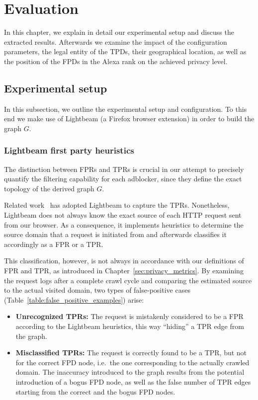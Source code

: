 
\chapter{Evaluation}
\label{sec:evaluation}
In this chapter, we explain in detail our experimental setup and discuss the extracted results. Afterwards we examine the impact of the configuration parameters, the legal entity of the TPDs, their geographical location, as well as the position of the FPDs in the Alexa rank on the achieved privacy level.

\section{Experimental setup}
In this subsection, we outline the experimental setup and configuration. To this end we make use of Lightbeam (a Firefox browser extension) in order to build the graph $G$.

\subsection{Lightbeam first party heuristics}
The distinction between FPRs and TPRs is crucial in our attempt to precisely quantify the filtering capability for each adblocker, since they define the exact topology of the derived graph $G$.

Related work~\cite{ruffel2015} has adopted Lightbeam to capture the TPRs. Nonetheless, Lightbeam does not always know the exact source of each HTTP request sent from our browser. As a consequence, it implements heuristics to determine the source domain that a request is initiated from and afterwards classifies it accordingly as a FPR or a TPR.

This classification, however, is not always in accordance with our definitions of FPR and TPR, as introduced in Chapter~\ref{sec:privacy_metrics}. By examining the request logs after a complete crawl cycle and comparing the estimated source to the actual visited domain, two types of false-positive cases (Table~\ref{table:false_positive_examples}) arise:

\begin{itemize}
\item \textbf{Unrecognized TPRs:} The request is mistakenly considered to be a FPR according to the Lightbeam heuristics, this way ``hiding'' a TPR edge from the graph.
\item \textbf{Misclassified TPRs:} The request is correctly found to be a TPR, but not for the correct FPD node, i.e.\ the one corresponding to the actually crawled domain. The inaccuracy introduced to the graph results from the potential introduction of a bogus FPD node, as well as the false number of TPR edges starting from the correct and the bogus FPD nodes.
\end{itemize}

